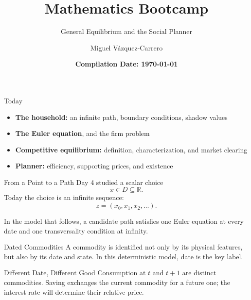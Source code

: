 \documentclass[11pt,aspectratio=169,c]{beamer}
\title{\textbf{Mathematics Bootcamp}}
\subtitle{General Equilibrium and the Social Planner}
\author{Miguel V\'azquez-Carrero}
\date{\textbf{Compilation Date: \today}}
\begin{document}
\begin{frame}
  \vfill
  \titlepage
  \vfill
\end{frame}

\begin{frame}{Today}
  \begin{itemize}
    \item \textbf{The household:} an infinite path, boundary conditions, shadow values
    \item \textbf{The Euler equation}, and the firm problem
    \item \textbf{Competitive equilibrium:} definition, characterization, and market clearing
    \item \textbf{Planner:} efficiency, supporting prices, and existence
  \end{itemize}
\end{frame}

\begin{frame}{From a Point to a Path}
  Day 4 studied a scalar choice
  \[
    x\in D\subseteq\mathbb{R}.
  \]
  Today the choice is an infinite sequence:
  \[
    z=(x_0,x_1,x_2,\ldots).
  \]

    \vspace{.55em}
  In the model that follows, a candidate path satisfies one Euler equation
  at every date and one transversality condition at infinity.
\end{frame}

\begin{frame}{Dated Commodities}
  A commodity is identified not only by its physical features, but also by its
  date and state. In this deterministic model, date is the key label.

    \vspace{.50em}
  \begin{block}{Different Date, Different Good}
    Consumption at $t$ and $t+1$ are distinct commodities. Saving exchanges
    the current commodity for a future one; the interest rate will determine
    their relative price.
  \end{block}
\end{frame}
\end{document}

